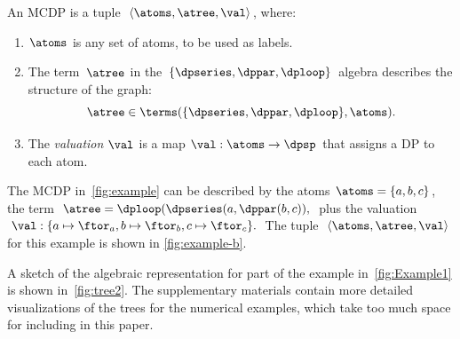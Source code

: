 \begin{definition}
  \label{def:MCDP-algebraic}An MCDP is a tuple~$\left\langle \atoms,\atree,\val\right\rangle $,
  where:
  \begin{enumerate}
    \item $\atoms$ is any set of atoms, to be used as labels.
    \item The term~$\atree$ in the $\{\dpseries,\dppar,\dploop\}$ algebra
    describes the structure of the graph:
    \[
      \atree\in\terms(\{\dpseries,\dppar,\dploop\},\atoms).
    \]
    \item The \emph{valuation} $\val$ is a map $\val:\atoms\rightarrow\dpsp$
    that assigns a DP to each atom.
  \end{enumerate}
\end{definition}
\begin{example}
  The MCDP in~\cref{fig:example} can be described by the atoms
  $\atoms=\{a,b,c\}$, the term $\atree=\dploop(\dpseries(a,\dppar(b,c)),$
  plus the valuation $\val:\{a\mapsto\ftor_{a},b\mapsto\ftor_{b},c\mapsto\ftor_{c}\}.$
  The tuple~$\left\langle \atoms,\atree,\val\right\rangle $ for this
  example is shown in \cref{fig:example-b}.
\end{example}
\begin{example}
  A sketch of the algebraic representation for part of the example in~\cref{fig:Example1}
  is shown in~\cref{fig:tree2}. The supplementary materials contain
  more detailed visualizations of the trees for the numerical examples,
  which take too much space for including in this paper.
\end{example}
